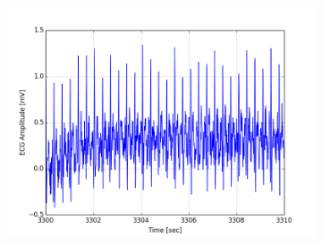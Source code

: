 \documentclass[paper=a4, fontsize=11pt]{scrartcl}
\numberwithin{equation}{section}		%
\numberwithin{figure}{section}			%
\numberwithin{table}{section}		    %
\begin{document}
\begin{appendices}
\begin{figure}[H]
\begin{subfigure}[b]{0.3\textwidth}
		\includegraphics[width=\textwidth]{sim/ecg_66}
	\end{subfigure}
\end{figure}


\end{appendices}
\end{document}

